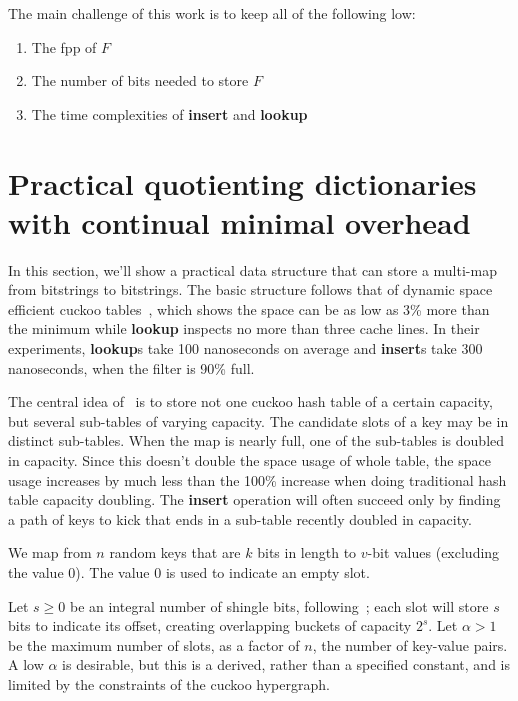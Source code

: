 \documentclass[11pt,letterpaper]{article}
\begin{document}
The main challenge of this work is to keep all of the following low:

\begin{enumerate}
\item The fpp of $F$
\item The number of bits needed to store $F$
\item The time complexities of {\bf insert} and {\bf lookup}
\end{enumerate}

\section{Practical quotienting dictionaries with continual minimal overhead}

In this section, we'll show a practical data structure that can store a multi-map from bitstrings to bitstrings.
The basic structure follows that of dynamic space efficient cuckoo tables~\cite{maier2019dynamic}, which shows the space can be as low as 3\% more than the minimum while {\bf lookup} inspects no more than three cache lines.
In their experiments, {\bf lookup}s take 100 nanoseconds on average and {\bf insert}s take 300 nanoseconds, when the filter is 90\% full.

The central idea of~\cite{maier2019dynamic} is to store not one cuckoo hash table of a certain capacity, but several sub-tables of varying capacity.
The candidate slots of a key may be in distinct sub-tables.
When the map is nearly full, one of the sub-tables is doubled in capacity.
Since this doesn't double the space usage of whole table, the space usage increases by much less than the 100\% increase when doing traditional hash table capacity doubling.
The {\bf insert} operation will often succeed only by finding a path of keys to kick that ends in a sub-table recently doubled in capacity.

We map from $n$ random keys that are $k$ bits in length to $v$-bit values (excluding the value $0$).
The value $0$ is used to indicate an empty slot.

Let $s \geq 0$ be an integral number of shingle bits, following~\cite{lehman20093}; each slot will store $s$ bits to indicate its offset, creating overlapping buckets of capacity $2^s$.
Let $\alpha > 1$ be the maximum number of slots, as a factor of $n$, the number of key-value pairs.
A low $\alpha$ is desirable, but this is a derived, rather than a specified constant, and is limited by the constraints of the cuckoo hypergraph.
\end{document}
